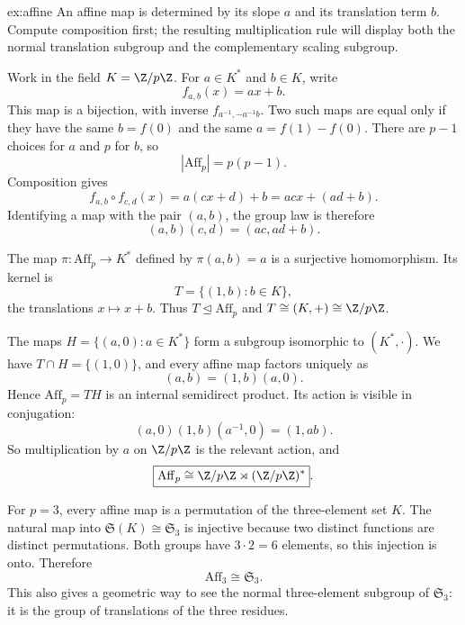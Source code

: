 \begin{solution}{ex:affine}
\idea An affine map is determined by its slope $a$ and its translation term $b$. Compute composition first; the resulting multiplication rule will display both the normal translation subgroup and the complementary scaling subgroup.

\writeup Work in the field $K=\Z/p\Z$. For $a\in K^*$ and $b\in K$, write
\[
f_{a,b}(x)=ax+b.
\]
This map is a bijection, with inverse $f_{a^{-1},-a^{-1}b}$. Two such maps are equal only if they have the same $b=f(0)$ and the same $a=f(1)-f(0)$. There are $p-1$ choices for $a$ and $p$ for $b$, so
\[
|\mathrm{Aff}_p|=p(p-1).
\]
Composition gives
\[
f_{a,b}\circ f_{c,d}(x)
=a(cx+d)+b=acx+(ad+b).
\]
Identifying a map with the pair $(a,b)$, the group law is therefore
\[
(a,b)(c,d)=(ac,ad+b).
\]

The map $\pi:\mathrm{Aff}_p\to K^*$ defined by $\pi(a,b)=a$ is a surjective homomorphism. Its kernel is
\[
T=\{(1,b):b\in K\},
\]
the translations $x\mapsto x+b$. Thus $T\trianglelefteq\mathrm{Aff}_p$ and $T\cong(K,+)\cong\Z/p\Z$.

The maps $H=\{(a,0):a\in K^*\}$ form a subgroup isomorphic to $(K^*,\cdot)$. We have $T\cap H=\{(1,0)\}$, and every affine map factors uniquely as
\[
(a,b)=(1,b)(a,0).
\]
Hence $\mathrm{Aff}_p=TH$ is an internal semidirect product. Its action is visible in conjugation:
\[
(a,0)(1,b)(a^{-1},0)=(1,ab).
\]
So multiplication by $a$ on $\Z/p\Z$ is the relevant action, and
\[
\boxed{\mathrm{Aff}_p\cong\Z/p\Z\rtimes(\Z/p\Z)^*}.
\]

For $p=3$, every affine map is a permutation of the three-element set $K$. The natural map into $\mathfrak S(K)\cong\mathfrak S_3$ is injective because two distinct functions are distinct permutations. Both groups have $3\cdot2=6$ elements, so this injection is onto. Therefore
\[
\mathrm{Aff}_3\cong\mathfrak S_3.
\]
This also gives a geometric way to see the normal three-element subgroup of $\mathfrak S_3$: it is the group of translations of the three residues.
\end{solution}

